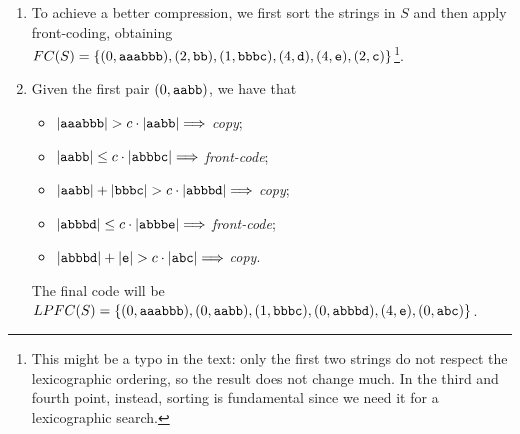 \begin{enumerate}

  \item To achieve a better compression, we first sort the strings in $S$ and
  then apply front-coding, obtaining $FC(S) = \{ (0, \text{\tt aaabbb}), (2,
  \text{\tt bb}), (1, \text{\tt bbbc}), (4, \text{\tt d}), (4, \text{\tt e}),
  (2, \text{\tt c}) \}$\footnote{This might be a typo in the text: only the
  first two strings do not respect the lexicographic ordering, so the result
  does not change much. In the third and fourth point, instead, sorting is
  fundamental since we need it for a lexicographic search.}.

  \item Given the first pair $(0, \text{\tt aabb})$, we have that
  \begin{itemize}

    \item $|\text{\tt aaabbb}| > c \cdot |\text{\tt aabb}| \Longrightarrow$
    \emph{copy};

    \item $|\text{\tt aabb}| \le c \cdot |\text{\tt abbbc}| \Longrightarrow$
    \emph{front-code};

    \item $|\text{\tt aabb}| + |\text{\tt bbbc}| > c \cdot |\text{\tt abbbd}|
    \Longrightarrow$ \emph{copy};

    \item $|\text{\tt abbbd}| \le c \cdot |\text{\tt abbbe}| \Longrightarrow$
    \emph{front-code};

    \item $|\text{\tt abbbd}| + |\text{\tt e}| > c \cdot |\text{\tt abc}|
    \Longrightarrow$ \emph{copy}.

  \end{itemize}
  The final code will be  $LPFC(S) = \{ (0, \text{\tt aaabbb}), (0,  \text{\tt
  aabb}), (1, \text{\tt bbbc}), (0, \text{\tt abbbd}), (4, \text{\tt e}), (0,
  \text{\tt abc}) \}$.


\end{enumerate}
